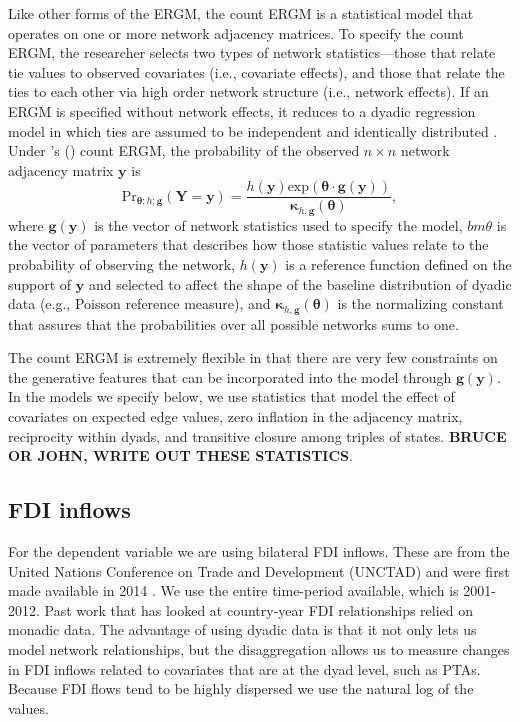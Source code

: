 \documentclass{article}
\newcommand\citeapos[1]{\citeauthor{#1}'s (\citeyear{#1})}
\begin{document}
Like other forms of the ERGM, the count ERGM is a statistical model that operates on one or more network adjacency matrices. To specify the count ERGM, the researcher selects two types of network statistics---those that relate tie values to observed covariates (i.e., covariate effects), and those that relate the ties to each other via high order network structure (i.e., network effects). If an ERGM is specified without network effects, it reduces to a dyadic regression model in which ties are assumed to be independent and identically distributed \cite{cranmer2011inferential}. Under \citeapos{krivitsky2012exponential} count ERGM, the probability of the observed $n \times n$ network adjacency matrix $\bm{y}$ is $$ \text{Pr}_{\bm{\theta};h;\bm{g}}( \bm{Y}=\bm{y} )=\frac{ h(\bm{y})\text{exp}( \bm{\theta} \cdot \bm{g} (\bm{y}) )}{\bm{\kappa}_{h,\bm{g}}(\bm{\theta})},$$ where $\bm{g}( \bm{y} )$ is the vector of network statistics used to specify the model, $bm{\theta}$ is the vector of parameters that describes how those statistic values relate to the probability of observing the network, $h(\bm{y})$ is a reference function defined on the support of $\bm{y}$ and selected to affect the shape of the baseline distribution of dyadic data (e.g., Poisson reference measure), and $\bm{\kappa}_{h,\bm{g}}(\bm{\theta})$ is the normalizing constant that assures that the probabilities over all possible networks sums to one. 

The count ERGM is extremely flexible in that there are very few constraints on the generative features that can be incorporated into the model through $\bm{g}( \bm{y} )$. In the models we specify below, we use statistics that model the effect of covariates on expected edge values, zero inflation in the adjacency matrix, reciprocity within dyads, and transitive closure among triples of states. {\bf BRUCE OR JOHN, WRITE OUT THESE STATISTICS}.





\subsection{FDI inflows}

For the dependent variable we are using bilateral FDI inflows. These are from the United Nations Conference on Trade and Development (UNCTAD) and were first made available in 2014 \citep{UNCTAD}. We use the entire time-period available, which is 2001-2012. Past work that has looked at country-year FDI relationships relied on monadic data. The advantage of using dyadic data is that it not only lets us model network relationships, but the disaggregation allows us to measure changes in FDI inflows related to covariates that are at the dyad level, such as PTAs. Because FDI flows tend to be highly dispersed we use the natural log of the values. 
\end{document}
